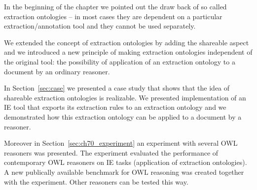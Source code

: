 In the beginning of the chapter we pointed out the draw back of so called extraction ontologies -- in most cases they are dependent on a particular extraction/annotation tool and they cannot be used separately.	

We extended the concept of extraction ontologies by adding the shareable aspect and we introduced a new principle of making extraction ontologies independent of the original tool: the possibility of application of an extraction ontology to a document by an ordinary reasoner.

In Section~\ref{sec:case} we presented a case study that shows that the idea of shareable extraction ontologies is realizable. We presented implementation of an IE tool that exports its extraction rules to an extraction ontology and we demonstrated how this extraction ontology can be applied to a document by a reasoner.

Moreover in Section~\ref{sec:ch70_experiment} an experiment with several OWL reasoners was presented. The experiment evaluated the performance of contemporary OWL reasoners on IE tasks (application of extraction ontologies). A new publically available benchmark for OWL reasoning was created together with the experiment. Other reasoners can be tested this way.


